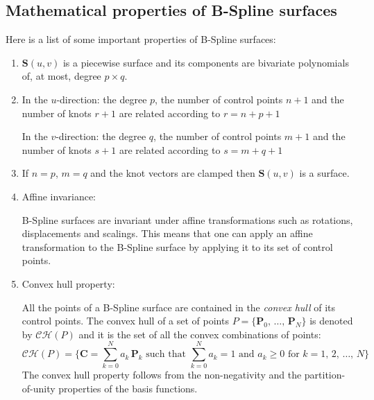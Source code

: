 \subsection{Mathematical properties of B-Spline surfaces}
Here is a list of some important properties of B-Spline surfaces:

\begin{enumerate}

    \item $\mathbf{S}(u, v)$ is a piecewise surface and its components are bivariate polynomials of, at most, degree $p\times q$.
    
    \item In the $u$-direction: the degree $p$, the number of control points $n+1$ and the number of knots $r+1$ are related according to $r = n + p + 1$
    
    In the $v$-direction: the degree $q$, the number of control points $m+1$ and the number of knots $s+1$ are related according to $s = m + q + 1$
    
    \item If $n = p$, $m = q$ and the knot vectors are clamped then $\mathbf{S}(u, v)$ is a \Bezier surface.
    
    \item Affine invariance:
    
    B-Spline surfaces are invariant under affine transformations such as rotations, displacements and scalings. This means that one can apply an affine transformation to the B-Spline surface by applying it to its set of control points.
    
    \item Convex hull property:
    
    All the points of a B-Spline surface are contained in the \textit{convex hull} of its control points.
    The convex hull of a set of points $P = \{\mathbf{P}_{0},\, \dots,\, \mathbf{P}_{N}\}$ is denoted by $\mathcal{CH}(P)$ and it is the set of all the convex combinations of points:
    \begin{equation*}
     \mathcal{CH}(P) = \Big\{ \mathbf{C} =  \sum_{k=0}^{N} a_{k} \, \mathbf{P}_{k} \text{ such that } \sum_{k=0}^{N} a_{k} = 1 \text{ and } a_{k}\geq 0 \text{ for } k = 1,\, 2,\, \dots,\, N\Big\}
    \end{equation*}
    The convex hull property follows from the non-negativity and the partition-of-unity properties of the basis functions.
    

\end{enumerate}
